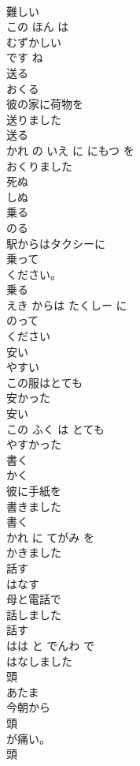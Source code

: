 \documentclass[8pt]{extreport}
\begin{document}
\begin{CJK}{UTF8}{min}
\\	難しい 
\\	この ほん は 
\\	むずかしい
\\	です ね	
\\	送る	
\\	おくる	
\\	彼の家に荷物を
\\	送りました
\\	送る 
\\	かれ の いえ に にもつ を 
\\	おくりました
\\	死ぬ	
\\	しぬ	
\\	乗る	
\\	のる	
\\	駅からはタクシーに
\\	乗って
\\	ください。	
\\	乗る 
\\	えき からは たくしー に 
\\	のって
\\	ください	
\\	安い	
\\	やすい	
\\	この服はとても
\\	安かった
\\	安い 
\\	この ふく は とても 
\\	やすかった
\\	書く	
\\	かく	
\\	彼に手紙を
\\	書きました
\\	書く 
\\	かれ に てがみ を 
\\	かきました
\\	話す	
\\	はなす	
\\	母と電話で
\\	話しました
\\	話す 
\\	はは と でんわ で 
\\	はなしました
\\	頭	
\\	あたま	
\\	今朝から
\\	頭
\\	が痛い。	
\\	頭 

\end{CJK}
\end{document}
